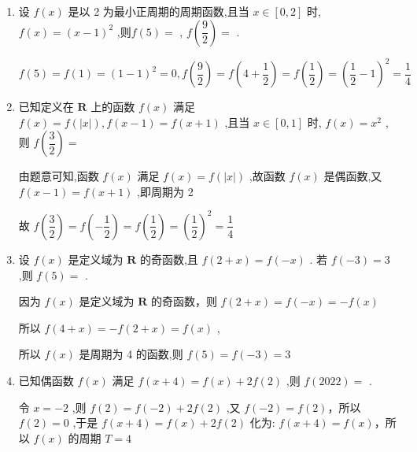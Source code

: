 \begin{enumerate}
\begin{jieda}
        所以 $f\left( {2024}\right)  = f\left( {{674} \times  3 + 2}\right)  = f\left( 2\right)  = {2}^{2} + 4 = 8$
    \end{jieda} 
    \item 设 $f\left( x\right)$ 是以 2 为最小正周期的周期函数,且当 $x \in  \left\lbrack  {0,2}\right\rbrack$ 时, $f\left( x\right)  = {\left( x - 1\right) }^{2}$ ,则$f\left( 5\right)  =$ , $f\left( \dfrac{9}{2}\right)  =$ .
    \begin{jieda}
        $f\left( 5\right)  = f\left( 1\right)  = {\left( 1 - 1\right) }^{2} = 0,f\left( \dfrac{9}{2}\right)  = f\left( {4 + \dfrac{1}{2}}\right)  = f\left( \dfrac{1}{2}\right)  = {\left( \dfrac{1}{2} - 1\right) }^{2} = \dfrac{1}{4}$
    \end{jieda} 
    \item 已知定义在 $\mathbf{R}$ 上的函数 $f\left( x\right)$ 满足 $f\left( x\right)  = f\left( \left| x\right| \right) ,f\left( {x - 1}\right)  = f\left( {x + 1}\right)$ ,且当 $x \in  \left\lbrack  {0,1}\right\rbrack$ 时, $f\left( x\right)  = {x}^{2}$ ,则 $f\left( \dfrac{3}{2}\right)  =$ 
    \begin{jieda}
        由题意可知,函数 $f\left( x\right)$ 满足 $f\left( x\right)  = f\left( \left| x\right| \right)$ ,故函数 $f\left( x\right)$ 是偶函数,又 $f\left( {x - 1}\right)  = f(x + 1)$ ,即周期为 2
        
        故 $f\left( \dfrac{3}{2}\right)  = f\left( {-\dfrac{1}{2}}\right)  = f\left( \dfrac{1}{2}\right)  = {\left( \dfrac{1}{2}\right) }^{2} = \dfrac{1}{4}$
    \end{jieda}
    \item 设 $f\left( x\right)$ 是定义域为 $\mathbf{R}$ 的奇函数,且 $f\left( {2 + x}\right)  = f\left( {-x}\right)$ . 若 $f\left( {-3}\right)  = 3$ ,则 $f\left( 5\right)  =$ .
    \begin{jieda}
        因为 $f\left( x\right)$ 是定义域为 $\mathbf{R}$ 的奇函数，则 $f\left( {2 + x}\right)  = f\left( {-x}\right)  =  - f\left( x\right)$
        
        所以 $f\left( {4 + x}\right)  =  - f\left( {2 + x}\right)  = f\left( x\right)$ ,
        
        所以 $f\left( x\right)$ 是周期为 4 的函数,则 $f\left( 5\right)  = f\left( {-3}\right)  = 3$
    \end{jieda}
    \item 已知偶函数 $f\left( x\right)$ 满足 $f\left( {x + 4}\right)  = f\left( x\right)  + {2f}\left( 2\right)$ ,则 $f\left( {2022}\right)  =$ .
    \begin{jieda}
        令 $x =  - 2$ ,则 $f\left( 2\right)  = f\left( {-2}\right)  + {2f}\left( 2\right)$ ,又 $f\left( {-2}\right)  = f\left( 2\right)$，所以 $f\left( 2\right)  = 0$ ,于是 $f\left( {x + 4}\right)  = f\left( x\right)  + {2f}\left( 2\right)$ 化为: $f\left( {x + 4}\right)  = f\left( x\right)$，所以 $f\left( x\right)$ 的周期 $T = 4$
        

\end{jieda}
\end{enumerate}

